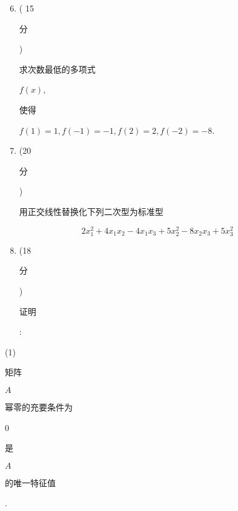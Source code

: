 \documentclass[10pt]{article}
\begin{document}
\begin{enumerate}
  \setcounter{enumi}{5}
  \item ( 15 \begin{CJK}{UTF8}{mj}分\end{CJK}) \begin{CJK}{UTF8}{mj}求次数最低的多项式\end{CJK} $f(x)$, \begin{CJK}{UTF8}{mj}使得\end{CJK} $f(1)=1, f(-1)=-1, f(2)=2, f(-2)=-8$.

  \item (20 \begin{CJK}{UTF8}{mj}分\end{CJK}) \begin{CJK}{UTF8}{mj}用正交线性替换化下列二次型为标准型\end{CJK}

\end{enumerate}
$$
2 x_{1}^{2}+4 x_{1} x_{2}-4 x_{1} x_{3}+5 x_{2}^{2}-8 x_{2} x_{3}+5 x_{3}^{2}
$$

\begin{enumerate}
  \setcounter{enumi}{7}
  \item (18 \begin{CJK}{UTF8}{mj}分\end{CJK}) \begin{CJK}{UTF8}{mj}证明\end{CJK}:
\end{enumerate}
(1) \begin{CJK}{UTF8}{mj}矩阵\end{CJK} $A$ \begin{CJK}{UTF8}{mj}幂零的充要条件为\end{CJK} 0 \begin{CJK}{UTF8}{mj}是\end{CJK} $A$ \begin{CJK}{UTF8}{mj}的唯一特征值\end{CJK}.
\end{document}
